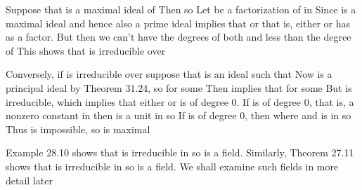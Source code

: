 \documentclass[11pt,oneside]{article}
\begin{document}
\BookNarrativetrue

\begin{BookBody}

 Suppose that  is a maximal ideal of  Then  so  Let  be a factorization of  in  Since  is a maximal ideal and hence also a prime ideal implies that  or  that is, either  or  has  as a factor. But then we can’t have the degrees of both  and  less than the degree of  This shows that  is irreducible over 

Conversely, if  is irreducible over  suppose that  is an ideal such that  Now  is a principal ideal by Theorem 31.24, so  for some  Then  implies that  for some  But  is irreducible, which implies that either  or  is of degree 0. If  is of degree 0, that is, a nonzero constant in  then  is a unit in  so  If  is of degree 0, then  where  and  is in  so  Thus  is impossible, so  is maximal\BookEnd{\blacklozenge}

 Example 28.10 shows that  is irreducible in  so  is a field. Similarly, Theorem 27.11 shows that  is irreducible in  so   is a field. We shall examine such fields in more detail later\BookEnd{\blacktriangle}


\end{BookBody}
\end{document}
